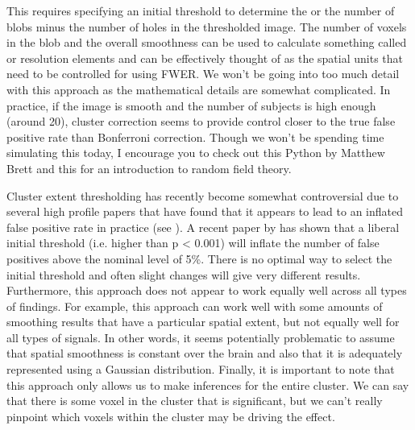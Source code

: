 \documentclass[letterpaper,10pt,english]{sphinxmanual}
\begin{document}

This requires specifying an initial threshold to determine the  or the number of blobs minus the number of holes in the thresholded image. The number of voxels in the blob and the overall smoothness can be used to calculate something called  or resolution elements and can be effectively thought of as the spatial units that need to be controlled for using FWER. We won’t be going into too much detail with this approach as the mathematical details are somewhat complicated. In practice, if the image is smooth and the number of subjects is high enough (around 20), cluster correction seems to provide control closer to the true false positive rate than Bonferroni correction. Though we won’t be spending time simulating this today, I encourage you to check out this Python  by Matthew Brett and this  for an introduction to random field theory.


Cluster extent thresholding has recently become somewhat controversial due to several high profile papers that have found that it appears to lead to an inflated false positive rate in practice (see ). A recent paper by  has shown that a liberal initial threshold (i.e. higher than p \textless{} 0.001) will inflate the number of false positives above the nominal level of 5\%. There is no optimal way to select the initial threshold and often slight changes will give very different results. Furthermore, this approach does not appear to work equally well across all types of findings. For example, this approach can work well with some amounts of smoothing results that have a particular spatial extent, but not equally well for all types of signals. In other words, it seems potentially problematic to assume that spatial smoothness is constant over the brain and also that it is adequately represented using a Gaussian distribution. Finally, it is important to note that this approach only allows us to make inferences for the entire cluster. We can say that there is some voxel in the cluster that is significant, but we can’t really pinpoint which voxels within the cluster may be driving the effect.
\end{document}
